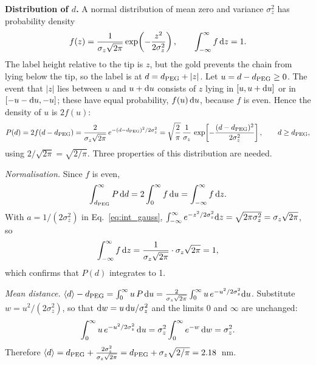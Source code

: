 \documentclass[10pt,a4paper]{article}
\numberwithin{equation}{section}
\newcommand{\meanDana}{2.18}
\begin{document}
\textbf{Distribution of $d$.} A normal distribution of mean zero and variance $\sigma_z^2$ has probability density
\begin{equation}
  f(z)=\frac{1}{\sigma_z\sqrt{2\pi}}\exp\!\left(-\frac{z^2}{2\sigma_z^2}\right),\qquad \int_{-\infty}^{\infty}f\,{\rm d}z=1.
  \label{eq:normal}
\end{equation}
The label height relative to the tip is $z$, but the gold prevents the chain from lying below the tip, so
the label is at $d=d_{\rm PEG}+|z|$. Let $u=d-d_{\rm PEG}\ge0$. The event that $|z|$ lies between $u$ and $u+{\rm d}u$
consists of $z$ lying in $[u,u+{\rm d}u]$ or in $[-u-{\rm d}u,-u]$; these have equal probability, $f(u)\,{\rm d}u$, because
$f$ is even. Hence the density of $u$ is $2f(u)$:
\begin{equation}
  P(d)=2f(d-d_{\rm PEG})=\frac{2}{\sigma_z\sqrt{2\pi}}\,e^{-(d-d_{\rm PEG})^2/2\sigma_z^2}
  =\sqrt{\frac{2}{\pi}}\,\frac{1}{\sigma_z}\,
  \exp\!\left[-\frac{(d-d_{\rm PEG})^2}{2\sigma_z^2}\right],\qquad d\ge d_{\rm PEG},
  \label{eq:Pd}
\end{equation}
using $2/\sqrt{2\pi}=\sqrt{2/\pi}$. Three properties of this distribution are needed.

\emph{Normalisation.} Since $f$ is even,
\[
  \int_{d_{\rm PEG}}^{\infty}P\,{\rm d}d=2\int_0^\infty f\,{\rm d}u=\int_{-\infty}^{\infty}f\,{\rm d}z .
\]
With $a=1/(2\sigma_z^2)$ in Eq.~\eqref{eq:int_gauss},
$\int_{-\infty}^{\infty}e^{-z^2/2\sigma_z^2}{\rm d}z=\sqrt{2\pi\sigma_z^2}=\sigma_z\sqrt{2\pi}$, so
\begin{equation}
  \int_{-\infty}^{\infty}f\,{\rm d}z=\frac{1}{\sigma_z\sqrt{2\pi}}\cdot\sigma_z\sqrt{2\pi}=1 ,
  \label{eq:int_norm}
\end{equation}
which confirms that $P(d)$ integrates to 1.

\emph{Mean distance.} $\langle d\rangle-d_{\rm PEG}=\int_0^\infty u\,P\,{\rm d}u=\frac{2}{\sigma_z\sqrt{2\pi}}\int_0^\infty u\,e^{-u^2/2\sigma_z^2}{\rm d}u$.
Substitute $w=u^2/(2\sigma_z^2)$, so that ${\rm d}w=u\,{\rm d}u/\sigma_z^2$ and the limits $0$ and $\infty$ are unchanged:
\begin{equation}
  \int_0^\infty u\,e^{-u^2/2\sigma_z^2}\,{\rm d}u=\sigma_z^2\int_0^\infty e^{-w}\,{\rm d}w=\sigma_z^2 .
  \label{eq:int_u}
\end{equation}
Therefore $\langle d\rangle=d_{\rm PEG}+\frac{2\sigma_z^2}{\sigma_z\sqrt{2\pi}}=d_{\rm PEG}+\sigma_z\sqrt{2/\pi}=\meanDana$~nm.
\end{document}
